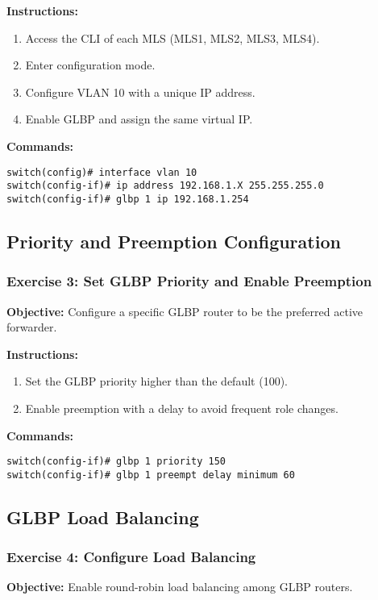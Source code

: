 \documentclass[12pt]{article}
\begin{document}
\textbf{Instructions:}
\begin{enumerate}
\item Access the CLI of each MLS (MLS1, MLS2, MLS3, MLS4).
\item Enter configuration mode.
\item Configure VLAN 10 with a unique IP address.
\item Enable GLBP and assign the same virtual IP.
\end{enumerate}

\textbf{Commands:}
\begin{lstlisting}[style=CiscoCLI]
switch(config)# interface vlan 10
switch(config-if)# ip address 192.168.1.X 255.255.255.0
switch(config-if)# glbp 1 ip 192.168.1.254
\end{lstlisting}

\bigskip

\subsection{Priority and Preemption Configuration}

\subsubsection*{Exercise 3: Set GLBP Priority and Enable Preemption}
\textbf{Objective:} Configure a specific GLBP router to be the preferred active forwarder.

\textbf{Instructions:}
\begin{enumerate}
\item Set the GLBP priority higher than the default (100).
\item Enable preemption with a delay to avoid frequent role changes.
\end{enumerate}

\textbf{Commands:}
\begin{lstlisting}[style=CiscoCLI]
switch(config-if)# glbp 1 priority 150
switch(config-if)# glbp 1 preempt delay minimum 60
\end{lstlisting}

\bigskip

\subsection{GLBP Load Balancing}

\subsubsection*{Exercise 4: Configure Load Balancing}
\textbf{Objective:} Enable round-robin load balancing among GLBP routers.
\end{document}
